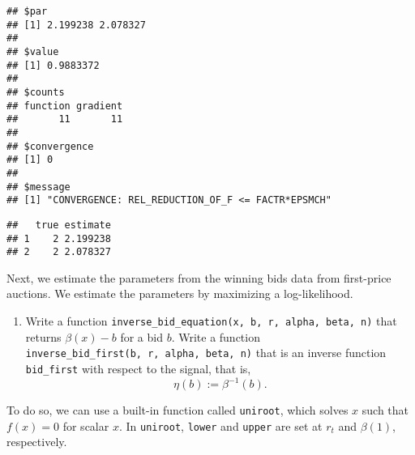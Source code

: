 \documentclass[
]{book}
\newenvironment{Shaded}{\begin{snugshade}}{\end{snugshade}}
\newcommand{\CommentTok}[1]{\textcolor[rgb]{0.56,0.35,0.01}{\textit{#1}}}
\newcommand{\DataTypeTok}[1]{\textcolor[rgb]{0.13,0.29,0.53}{#1}}
\newcommand{\DecValTok}[1]{\textcolor[rgb]{0.00,0.00,0.81}{#1}}
\newcommand{\FloatTok}[1]{\textcolor[rgb]{0.00,0.00,0.81}{#1}}
\newcommand{\KeywordTok}[1]{\textcolor[rgb]{0.13,0.29,0.53}{\textbf{#1}}}
\newcommand{\NormalTok}[1]{#1}
\newcommand{\OperatorTok}[1]{\textcolor[rgb]{0.81,0.36,0.00}{\textbf{#1}}}
\newcommand{\StringTok}[1]{\textcolor[rgb]{0.31,0.60,0.02}{#1}}
\providecommand{\tightlist}{%
  \setlength{\itemsep}{0pt}\setlength{\parskip}{0pt}}
\begin{document}
\begin{verbatim}
## $par
## [1] 2.199238 2.078327
## 
## $value
## [1] 0.9883372
## 
## $counts
## function gradient 
##       11       11 
## 
## $convergence
## [1] 0
## 
## $message
## [1] "CONVERGENCE: REL_REDUCTION_OF_F <= FACTR*EPSMCH"
\end{verbatim}

\begin{Shaded}
\end{Shaded}

\begin{verbatim}
##   true estimate
## 1    2 2.199238
## 2    2 2.078327
\end{verbatim}

Next, we estimate the parameters from the winning bids data from first-price auctions. We estimate the parameters by maximizing a log-likelihood.

\begin{enumerate}
\def\labelenumi{\arabic{enumi}.}
\setcounter{enumi}{4}
\tightlist
\item
  Write a function \texttt{inverse\_bid\_equation(x,\ b,\ r,\ alpha,\ beta,\ n)} that returns \(\beta(x) - b\) for a bid \(b\). Write a function \texttt{inverse\_bid\_first(b,\ r,\ alpha,\ beta,\ n)} that is an inverse function \texttt{bid\_first} with respect to the signal, that is,
  \[
  \eta(b) := \beta^{-1}(b).
  \]
\end{enumerate}

To do so, we can use a built-in function called \texttt{uniroot}, which solves \(x\) such that \(f(x) = 0\) for scalar \(x\). In \texttt{uniroot}, \texttt{lower} and \texttt{upper} are set at \(r_t\) and \(\beta(1)\), respectively.

\begin{Shaded}
\end{Shaded}
\end{document}
